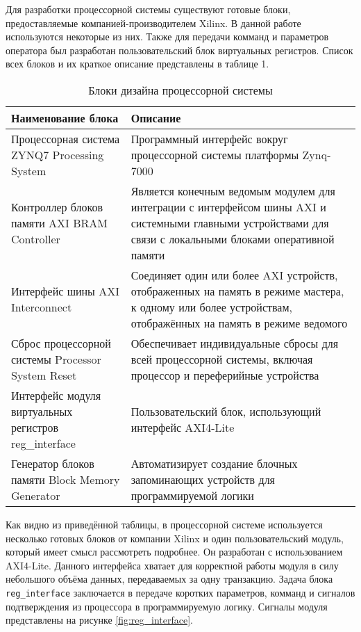 Для разработки процессорной системы существуют готовые блоки, предоставляемые компанией-производителем Xilinx. В данной работе используются некоторые из них. Также для передачи комманд и параметров оператора был разработан пользовательский блок виртуальных регистров. Список всех блоков и их краткое описание представлены в таблице 1.\par%
\begin{table}[ht]
    \label{tab:PS_blocks}
    \caption{Блоки дизайна процессорной системы}
    \begin{tabular}{|p{}|p{}|}
        \hline
        Наименование блока & Описание \\
        \hline
        Процессорная система ZYNQ7 Processing System & Программный интерфейс вокруг процессорной системы платформы Zynq-7000 \\
        \hline
        Контроллер блоков памяти AXI BRAM Controller & Является конечным ведомым модулем для интеграции с интерфейсом шины AXI и системными главными устройствами для связи с локальными блоками оперативной памяти \\
        \hline
        Интерфейс шины AXI Interconnect & Соединяет один или более AXI устройств, отображенных на память в режиме мастера, к одному или более устройствам, отображённых на память в режиме ведомого \\
        \hline
        Сброс процессорной системы Processor System Reset & Обеспечивает индивидуальные сбросы для всей процессорной системы, включая процессор и переферийные устройства \\
        \hline
        Интерфейс модуля виртуальных регистров reg\_interface & Пользовательский блок, использующий интерфейс AXI4-Lite \\
        \hline
        Генератор блоков памяти Block Memory Generator & Автоматизирует создание блочных запоминающих устройств для программируемой логики\\
        \hline
    \end{tabular}
\end{table}
Как видно из приведённой таблицы, в процессорной системе используется несколько готовых блоков от компании Xilinx и один пользовательский модуль, который имеет смысл рассмотреть подробнее. Он разработан с использованием AXI4-Lite. Данного интерфейса хватает для корректной работы модуля в силу небольшого объёма данных, передаваемых за одну транзакцию. Задача блока \texttt{reg\_interface} заключается в передаче коротких параметров, комманд и сигналов подтверждения из процессора в программируемую логику. Сигналы модуля представлены на рисунке \ref{fig:reg_interface}.\par 
